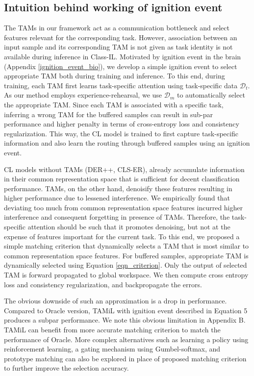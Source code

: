 \documentclass{article} %
\begin{document}
 
\subsection{Intuition behind working of ignition event}
The TAMs in our framework act as a communication bottleneck and select features relevant for the corresponding task. However, association between an input sample and its corresponding TAM is not given as task identity is not available during inference in Class-IL. Motivated by ignition event in the brain (Appendix \ref{ignition_event_bio}), we develop a simple ignition event to select appropriate TAM both during training and inference. To this end, during training, each TAM first learns task-specific attention using task-specific data $\mathcal{D}_t$. As our method employs experience-rehearsal, we use $\mathcal{D}_m$ to automatically select the appropriate TAM. Since each TAM is associated with a specific task, inferring a wrong TAM for the buffered samples can result in sub-par performance and higher penalty in terms of cross-entropy loss and consistency regularization. This way, the CL model is trained to first capture task-specific information and also learn the routing through buffered samples using an ignition event. 

 CL models without TAMs (DER++, CLS-ER), already accumulate information in their common representation space that is sufficient for decent classification performance. TAMs, on the other hand, denoisify these features resulting in higher performance due to lessened interference. We empirically found that deviating too much from common representation space features incurred higher interference and consequent forgetting in presence of TAMs. Therefore, the task-specific attention should be such that it promotes denoising, but not at the expense of features important for the current task. To this end, we proposed a simple matching criterion that dynamically selects a TAM that is most similar to common representation space features. For buffered samples, appropriate TAM is dynamically selected using Equation \ref{eqn_criterion}. Only the output of selected TAM is forward propagated to global workspace. We then compute cross entropy loss and consistency regularization, and backpropagate the errors.

 The obvious downside of such an approximation is a drop in performance. Compared to Oracle version, TAMiL with ignition event described in Equation 5 produces a subpar performance. We note this obvious limitation in Appendix B. TAMiL can benefit from more accurate matching criterion to match the performance of Oracle. More complex alternatives such as learning a policy using reinforcement learning, a gating mechanism using Gumbel-softmax, and prototype matching can also be explored in place of proposed matching criterion to further improve the selection accuracy. 
\end{document}
